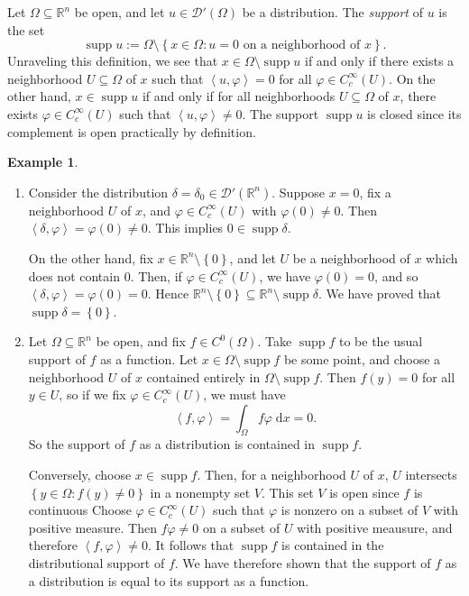\documentclass{book}
\newcommand{\scrD}{\mathscr{D}}
\newcommand{\bbR}{\mathbb{R}}
\renewcommand{\d}{\mathrm{d}}
\renewcommand{\phi}{\varphi}
\newcommand{\set}[1]{\left\{ {#1} \right\}}
\newcommand{\angles}[1]{\left\langle {#1} \right\rangle}
\DeclareMathOperator{\supp}{supp}
\theoremstyle{definition}
\newtheorem{example}[theorem]{Example}
\theoremstyle{remark}
\numberwithin{equation}{chapter}
\begin{document}
Let $\Omega \subseteq \bbR^n$ be open, and let $u \in \scrD'(\Omega)$ be a distribution. The \textit{support} of $u$ is the set 
\begin{equation}
    \supp{u} := \Omega \setminus \set{ x \in \Omega : u = 0 \text{ on a neighborhood of } x }.
\end{equation}
Unraveling this definition, we see that $x \in \Omega \setminus \supp{u}$ if and only if there exists a neighborhood $U \subseteq \Omega$ of $x$ such that $\angles{ u,\phi } = 0$ for all $\phi \in C_c^\infty(U)$. On the other hand, $x \in \supp{u}$ if and only if for all neighborhoods $U \subseteq \Omega$ of $x$, there exists $\phi \in C_c^\infty(U)$ such that $\angles{ u,\phi } \neq 0$. The support $\supp{u}$ is closed since its complement is open practically by definition.
\begin{example}
    \begin{enumerate}[label=(\arabic*)]
        \item Consider the distribution $\delta = \delta_0 \in \scrD'(\bbR^n)$. Suppose $x = 0$, fix a neighborhood $U$ of $x$, and $\phi \in C_c^\infty(U)$ with $\phi(0) \neq 0$. Then $\angles{ \delta,\phi } = \phi(0) \neq 0$. This implies $0 \in \supp{\delta}$. 
        
        On the other hand, fix $x \in \bbR^n \setminus \set{0}$, and let $U$ be a neighborhood of $x$ which does not contain $0$. Then, if $\phi \in C_c^\infty(U)$, we have $\phi(0) = 0$, and so $\angles{\delta,\phi} = \phi(0) = 0$. Hence $\bbR^n \setminus \set{0} \subseteq \bbR^n \setminus \supp{\delta}$. We have proved that $\supp{\delta} = \set{0}$.

        \item Let $\Omega \subseteq \bbR^n$ be open, and fix $f \in C^0(\Omega)$. Take $\supp{f}$ to be the usual support of $f$ as a function. Let $x \in \Omega \setminus \supp{f}$ be some point, and choose a neighborhood $U$ of $x$ contained entirely in $\Omega \setminus \supp{f}$. Then $f(y) = 0$ for all $y \in U$, so if we fix $\phi \in C_c^\infty(U)$, we must have 
        \begin{equation}
            \angles{ f,\phi } = \int_{\Omega} f \phi \; \d x = 0.
        \end{equation}
        So the support of $f$ as a distribution is contained in $\supp{f}$.

        Conversely, choose $x \in \supp{f}$. Then, for a neighborhood $U$ of $x$, $U$ intersects $\set{ y \in \Omega : f(y) \neq 0 }$ in a nonempty set $V$. This set $V$ is open since $f$ is continuous Choose $\phi \in C_c^\infty(U)$ such that $\phi$ is nonzero on a subset of $V$ with positive measure. Then $f\phi \neq 0$ on a subset of $U$ with positive meausure, and therefore $\angles{ f,\phi } \neq 0$. It follows that $\supp{f}$ is contained in the distributional support of $f$. We have therefore shown that the support of $f$ as a distribution is equal to its support as a function.
    \end{enumerate}
\end{example}
\end{document}
